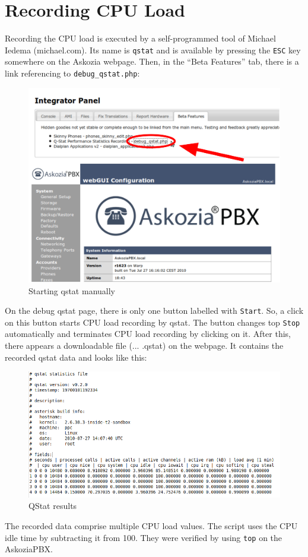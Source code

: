 \section{Recording CPU Load}
\label{sec:qstat}

Recording the CPU load is executed by a self-programmed tool of Michael Iedema (michael\@askozia.com). Its name is
\texttt{qstat} and is available by pressing the \texttt{ESC} key somewhere on the Askozia webpage. Then, in the
``Beta Features'' tab, there is a link referencing to \texttt{debug\_qstat.php}:

\begin{figure} [!ht]
\centering
\includegraphics [width=16cm] {qstat-1.pdf}
\caption{Starting qstat manually}
\end{figure}

On the debug qstat page, there is only one button labelled with \texttt{Start}. So, a click on this button starts CPU load
recording by qstat. The button changes top \texttt{Stop} automatically and terminates CPU load recording by clicking on it.
After this, there appears a downloadable file (... .qstat) on the webpage. It contains the recorded qstat data and looks like this:

\begin{figure} [!ht]
\centering
\includegraphics [width=17cm] {qstat-2}
\caption{QStat results}
\end{figure}

The recorded data comprise multiple CPU load values. The script uses the CPU idle time by subtracting it from 100. They were
verified by using \texttt{top} on the AskoziaPBX.
